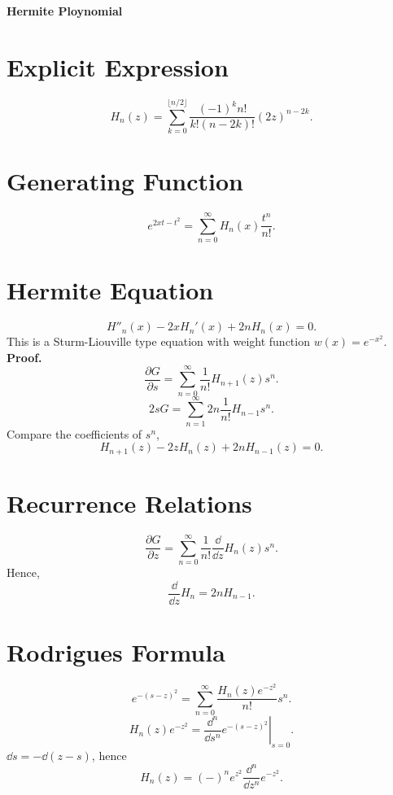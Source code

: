 \documentclass{article}
\theoremstyle{1}
\theoremstyle{2}
\newcommand{\pa}{\partial}
\begin{document}
\begin{center}
    \huge{\textbf{Hermite Ploynomial}}
\end{center}

\section{Explicit Expression}
\begin{equation}
    H_n(z)=\sum_{k=0}^{\lfloor n/2 \rfloor}\frac{(-1)^k n!}{k!(n-2k)!}(2z)^{n-2k}.
\end{equation}
\section{Generating Function}
\begin{equation}
    e^{2xt-t^2}=\sum_{n=0}^{\infty}H_n(x)\frac{t^n}{n!}.
\end{equation}
\section{Hermite Equation}
\begin{equation}
    H''_n(x)-2xH_n'(x)+2nH_n(x)=0.
\end{equation}
This is a Sturm-Liouville type equation with weight function $w(x)=e^{-x^2}$.
\newline
\textbf{Proof.}
    \begin{equation}
        \frac{\pa G}{\pa s}=\sum_{n=0}^{\infty}\frac{1}{n!}H_{n+1}(z)s^n.
    \end{equation}
    \begin{equation}
        2sG=\sum_{n=1}^{\infty}2n\frac{1}{n!}H_{n-1}s^n.
    \end{equation}
    Compare the coefficients of $s^n$,
    \begin{equation}
        \boxed{H_{n+1}(z)-2zH_n(z)+2nH_{n-1}(z)=0.}
    \end{equation}
\section{Recurrence Relations}
\begin{equation}
        \frac{\pa G}{\pa z}=\sum_{n=0}^{\infty}\frac{1}{n!}\frac{\dd}{\dd z}H_n(z)s^n.
    \end{equation}
    Hence,
    \begin{equation}
        \boxed{\frac{\dd}{\dd{z}}H_n=2nH_{n-1}.}
    \end{equation}
\section{Rodrigues Formula}
\begin{equation}
        e^{-(s-z)^2}=\sum_{n=0}^{\infty}\frac{H_n(z)e^{-z^2}}{n!}s^n.
    \end{equation}
    \begin{equation}
        H_n(z)e^{-z^2}=\left.\frac{\dd^n}{\dd{s}^n}e^{-(s-z)^2}\right|_{s=0}.
    \end{equation}
    $\dd{s}=-\dd{(z-s)}$, hence
    \begin{equation}
        \boxed{H_n(z)=(-)^ne^{z^2}\frac{\dd ^n}{\dd{z}^n}e^{-z^2}.}
    \end{equation}
\end{document}

